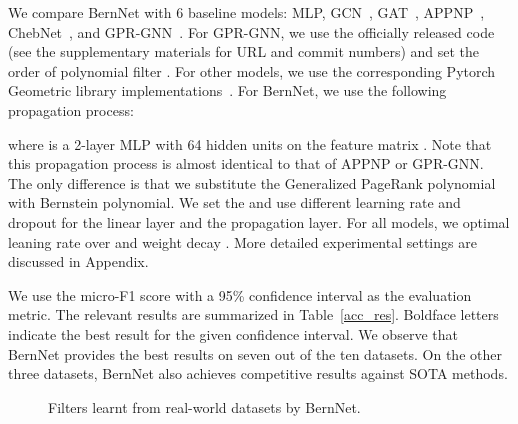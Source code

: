 \documentclass{article}
\begin{document}
We compare BernNet  with 6 baseline models: MLP, GCN~\cite{kipf2016semi}, GAT~\cite{gat}, APPNP~\cite{appnp}, ChebNet~\cite{Chebnet}, and GPR-GNN~\cite{chien2021GPR-GNN}.  For GPR-GNN, we use the officially released code (see the supplementary materials for URL and commit numbers) and set the order of polynomial filter . For other models, we use the corresponding Pytorch Geometric library implementations~\cite{fey2019fast}. For BernNet, we use the following propagation process:

where  is
a 2-layer MLP with 64 hidden units on the feature matrix . 
Note that this propagation process is almost identical to that of APPNP or GPR-GNN. 
The only difference is that we substitute the Generalized PageRank polynomial with Bernstein polynomial. We set the  and use different learning rate and dropout for the linear layer and the propagation layer. For all models, we optimal leaning rate over  and weight decay . More detailed experimental settings are discussed in Appendix.


We use the micro-F1 score with a 95\% confidence interval as the evaluation metric. 
The relevant results are summarized in Table~\ref{acc_res}. 
Boldface letters indicate the best result for the given confidence interval. 
We observe that BernNet provides the best results on seven out of the ten datasets. 
On the other three datasets, BernNet also achieves competitive results against SOTA methods. 



\begin{figure}[t]
    \centering
    \hspace{-2mm}
   \hspace{-2mm}
   \hspace{-2mm}
   \hspace{-2mm}
    \caption{Filters learnt from real-world datasets by BernNet.}
    \label{fig:filters_realdata}
\end{figure}
\end{document}
